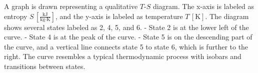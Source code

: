 A graph is drawn representing a qualitative \( T \)-\( S \) diagram. The x-axis is labeled as entropy \( S \, \left[\frac{\text{kJ}}{\text{kg·K}}\right] \), and the y-axis is labeled as temperature \( T \, [\text{K}] \). The diagram shows several states labeled as 2, 4, 5, and 6.  
- State 2 is at the lower left of the curve.  
- State 4 is at the peak of the curve.  
- State 5 is on the descending part of the curve, and a vertical line connects state 5 to state 6, which is further to the right.  
The curve resembles a typical thermodynamic process with isobars and transitions between states.